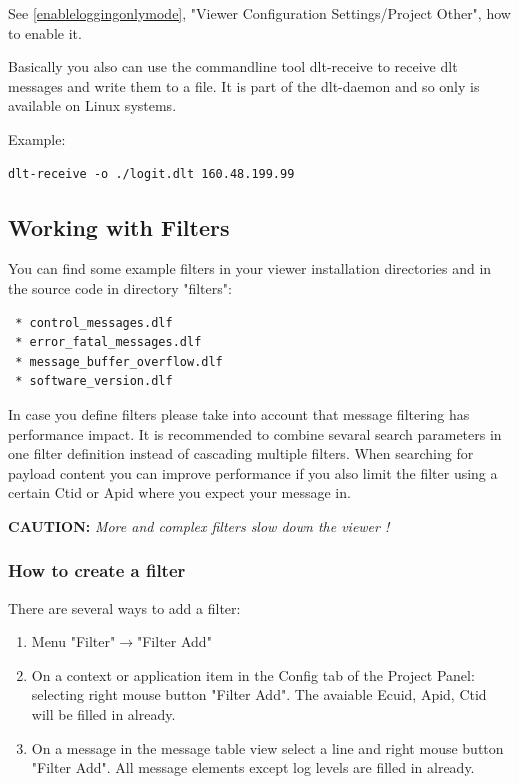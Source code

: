 \documentclass[a4paper,11pt]{article}
\newcommand{\caution}[1]{\begin{ibox} \textbf{CAUTION:} \emph{#1} \end{ibox}}
\begin{document}
See \autoref{enableloggingonlymode}, "Viewer Configuration Settings/Project Other", how to enable it.

Basically you also can use the commandline tool dlt-receive to receive dlt messages and write them to a file.
It is part of the dlt-daemon and so only is available on Linux systems.

Example:

\begin{verbatim}
dlt-receive -o ./logit.dlt 160.48.199.99
\end{verbatim}



\pagebreak

\subsection{Working with Filters}
\label{workingwithfilters}
You can find some example filters in your viewer installation directories and in the source code in directory "filters":
\begin{verbatim}
 * control_messages.dlf
 * error_fatal_messages.dlf
 * message_buffer_overflow.dlf
 * software_version.dlf
\end{verbatim}

In case you define filters please take into account that message filtering has performance impact. It is recommended to combine sevaral search parameters in one filter definition instead of cascading multiple filters.
When searching for payload content you can improve performance if you also limit the filter using a certain Ctid or Apid where you expect your message in.



\caution{More and complex filters slow down the viewer !}


\subsubsection{How to create a filter}

There are several ways to add a filter:
\begin{enumerate}
\item Menu "Filter"\ensuremath{\rightarrow}"Filter Add"
\item On a context or application item in the Config tab of the Project Panel: selecting right mouse button "Filter Add".
The avaiable Ecuid, Apid, Ctid will be filled in already.
\item On a message in the message table view select a line and right mouse button "Filter Add". All message elements except log levels are filled in already.
\end{enumerate}
\end{document}
